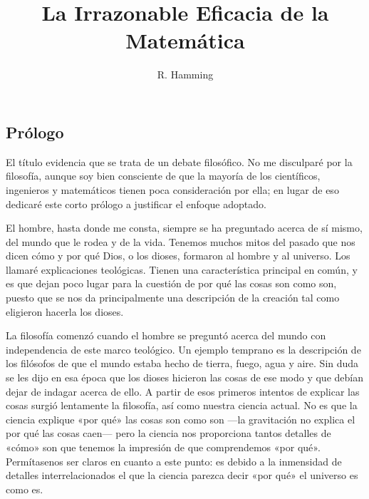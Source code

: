 \documentclass[a4paper, 12pt]{article}
\title{La Irrazonable Eficacia de la Matemática}
\author{R. Hamming}
\date{}
\begin{document}
\begin{tcolorbox}[colback=blue!5!white,colframe=blue!75!black]

\vspace{-1.8cm}
\textbf \maketitle

\end{tcolorbox}

\bigskip
 

\subsection*{Prólogo}

 El título evidencia que se trata de un debate filosófico. No me disculparé por la filosofía, aunque soy bien consciente de que la mayoría de los científicos, ingenieros y matemáticos tienen poca consideración por ella; en lugar de eso dedicaré este corto prólogo a justificar el enfoque adoptado.


El hombre, hasta donde me consta, siempre se ha preguntado acerca de sí mismo, del mundo que le rodea y de la vida. Tenemos muchos mitos del pasado que nos dicen cómo y por qué Dios, o los dioses, formaron al hombre y al universo. Los llamaré explicaciones teológicas. Tienen una característica principal en común, y es que dejan poco lugar para la cuestión de por qué las cosas son como son, puesto que se nos da principalmente una descripción de la creación tal como eligieron hacerla los dioses.

 

La filosofía comenzó cuando el hombre se preguntó acerca del mundo con independencia de este marco teológico. Un ejemplo temprano es la descripción de los filósofos de que el mundo estaba hecho de tierra, fuego, agua y aire. Sin duda se les dijo en esa época que los dioses hicieron las cosas de ese modo y que debían dejar de indagar acerca de ello. A partir de esos primeros intentos de explicar las cosas surgió lentamente la filosofía, así como nuestra ciencia actual. No es que la ciencia explique «por qué» las cosas son como son ---la gravitación no explica el por qué las cosas caen--- pero la ciencia nos proporciona tantos detalles de «cómo» son que tenemos la impresión de que comprendemos «por qué». Permítasenos ser claros en cuanto a este punto: es debido a la inmensidad de detalles interrelacionados el que la ciencia parezca decir «por qué» el universo es como es.
\end{document}
